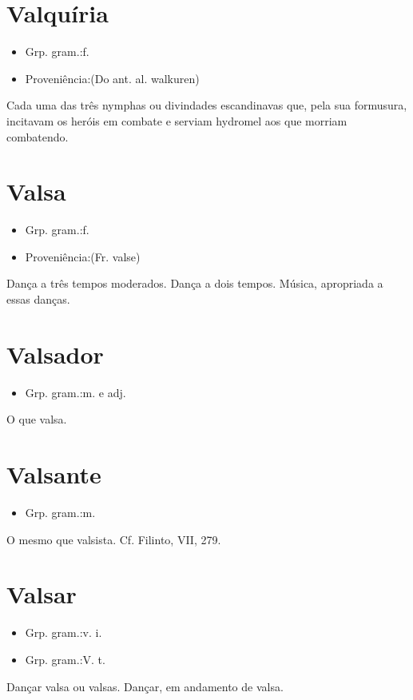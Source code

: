 \documentclass{article}
\begin{document}
\section{Valquíria}
\begin{itemize}
\item {Grp. gram.:f.}
\end{itemize}
\begin{itemize}
\item {Proveniência:(Do ant. al. \textunderscore walkuren\textunderscore )}
\end{itemize}
Cada uma das três nymphas ou divindades escandinavas que, pela sua formusura, incitavam os heróis em combate e serviam hydromel aos que morriam combatendo.
\section{Valsa}
\begin{itemize}
\item {Grp. gram.:f.}
\end{itemize}
\begin{itemize}
\item {Proveniência:(Fr. \textunderscore valse\textunderscore )}
\end{itemize}
Dança a três tempos moderados.
Dança a dois tempos.
Música, apropriada a essas danças.
\section{Valsador}
\begin{itemize}
\item {Grp. gram.:m.  e  adj.}
\end{itemize}
O que valsa.
\section{Valsante}
\begin{itemize}
\item {Grp. gram.:m.}
\end{itemize}
O mesmo que \textunderscore valsista\textunderscore . Cf. Filinto, VII, 279.
\section{Valsar}
\begin{itemize}
\item {Grp. gram.:v. i.}
\end{itemize}
\begin{itemize}
\item {Grp. gram.:V. t.}
\end{itemize}
Dançar valsa ou valsas.
Dançar, em andamento de valsa.
\end{document}
